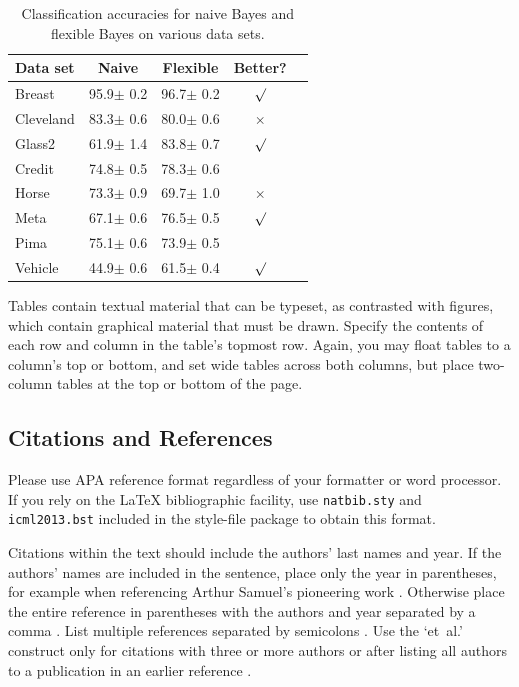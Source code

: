 \documentclass{article}
\begin{document}
\begin{table}[t]
\caption{Classification accuracies for naive Bayes and flexible 
Bayes on various data sets.}
\label{sample-table}
\vskip 0.15in
\begin{center}
\begin{small}
\begin{sc}
\begin{tabular}{lcccr}
\hline
\abovespace\belowspace
Data set & Naive & Flexible & Better? \\
\hline
\abovespace
Breast    & 95.9$\pm$ 0.2& 96.7$\pm$ 0.2& $\surd$ \\
Cleveland & 83.3$\pm$ 0.6& 80.0$\pm$ 0.6& $\times$\\
Glass2    & 61.9$\pm$ 1.4& 83.8$\pm$ 0.7& $\surd$ \\
Credit    & 74.8$\pm$ 0.5& 78.3$\pm$ 0.6&         \\
Horse     & 73.3$\pm$ 0.9& 69.7$\pm$ 1.0& $\times$\\
Meta      & 67.1$\pm$ 0.6& 76.5$\pm$ 0.5& $\surd$ \\
Pima      & 75.1$\pm$ 0.6& 73.9$\pm$ 0.5&         \\
\belowspace
Vehicle   & 44.9$\pm$ 0.6& 61.5$\pm$ 0.4& $\surd$ \\
\hline
\end{tabular}
\end{sc}
\end{small}
\end{center}
\vskip -0.1in
\end{table}

Tables contain textual material that can be typeset, as contrasted 
with figures, which contain graphical material that must be drawn. 
Specify the contents of each row and column in the table's topmost
row. Again, you may float tables to a column's top or bottom, and set
wide tables across both columns, but place two-column tables at the
top or bottom of the page.
 
\subsection{Citations and References} 

Please use APA reference format regardless of your formatter
or word processor. If you rely on the \LaTeX\/ bibliographic 
facility, use {\tt natbib.sty} and {\tt icml2013.bst} 
included in the style-file package to obtain this format.

Citations within the text should include the authors' last names and
year. If the authors' names are included in the sentence, place only
the year in parentheses, for example when referencing Arthur Samuel's
pioneering work . Otherwise place the entire
reference in parentheses with the authors and year separated by a
comma \cite{Samuel59}. List multiple references separated by
semicolons \cite{kearns89,Samuel59,mitchell80}. Use the `et~al.'
construct only for citations with three or more authors or after
listing all authors to a publication in an earlier reference \cite{MachineLearningI}.
\end{document}
